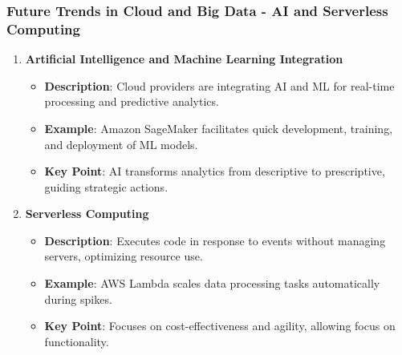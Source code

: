 \documentclass[aspectratio=169]{beamer}
\begin{document}
\begin{frame}[fragile]
    \frametitle{Future Trends in Cloud and Big Data - AI and Serverless Computing}
    \begin{enumerate}
        \item \textbf{Artificial Intelligence and Machine Learning Integration}
            \begin{itemize}
                \item \textbf{Description}: Cloud providers are integrating AI and ML for real-time processing and predictive analytics.
                \item \textbf{Example}: Amazon SageMaker facilitates quick development, training, and deployment of ML models.
                \item \textbf{Key Point}: AI transforms analytics from descriptive to prescriptive, guiding strategic actions.
            \end{itemize}

        \item \textbf{Serverless Computing}
            \begin{itemize}
                \item \textbf{Description}: Executes code in response to events without managing servers, optimizing resource use.
                \item \textbf{Example}: AWS Lambda scales data processing tasks automatically during spikes.
                \item \textbf{Key Point}: Focuses on cost-effectiveness and agility, allowing focus on functionality.
            \end{itemize}
    \end{enumerate}
\end{frame}
\end{document}
